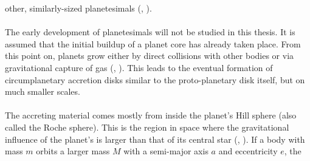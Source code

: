       other, similarly-sized planetesimals
      (\citeauthor{Morbidelli_2016}, \citeyear{Morbidelli_2016}). \\
      \\
      The early development of planetesimals will not be studied in this 
      thesis. It is assumed that the initial buildup of a planet core has 
      already taken place. From this point on, planets grow either by
      direct collisions with other bodies or via gravitational capture of gas
      (\citeauthor{Morbidelli_2016}, \citeyear{Morbidelli_2016}).
      This leads to the eventual formation of circumplanetary accretion disks
      similar to the proto-planetary disk itself, 
      but on much smaller scales. %
      \\
      \\
      The accreting material comes mostly from inside the planet's Hill sphere 
      (also called the Roche sphere). %
      This is the region in space where the gravitational 
      influence of the planet's is larger than that of its central star
      (\citeauthor{Hamilton_1992}, \citeyear{Hamilton_1992}). 
      If a body with mass $m$ orbits a larger 
      mass $M$ with a semi-major axis $a$ and eccentricity $e$, the 
